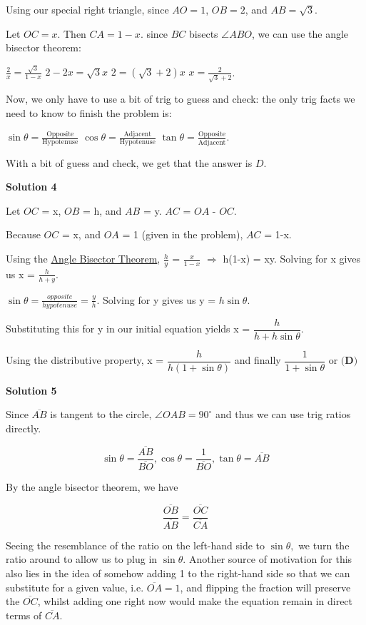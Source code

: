 \begin{enumerate}
 Using our special right triangle, since $AO=1$, $OB=2$, and $AB=\sqrt{3}$.

 Let $OC=x$.  Then $CA=1-x$.  since $BC$ bisects $\angle ABO$, we can use the angle bisector theorem:

 $\frac{2}{x}=\frac{\sqrt{3}}{1-x}$
$2-2x=\sqrt{3}x$
$2=(\sqrt{3}+2)x$
$x=\frac{2}{\sqrt{3}+2}$.

 Now, we only have to use a bit of trig to guess and check: the only trig facts we need to know to finish the problem is:

 $\sin\theta =\frac{\text{Opposite}}{\text{Hypotenuse}}$
$\cos\theta =\frac{\text{Adjacent}}{\text{Hypotenuse}}$
$\tan\theta =\frac{\text{Opposite}}{\text{Adjacent}}$.

 With a bit of guess and check, we get that the answer is $\boxed{D}$.

 



\textbf{Solution 4}

Let $OC$ = x, $OB$ = h, and $AB$ = y. $AC$ = $OA$ - $OC$.

 Because $OC$ = x, and $OA$ = 1 (given in the problem), $AC$ = 1-x.

 Using the \href{https://artofproblemsolving.com/wiki/index.php?title=Angle\_Bisector\_Theorem}{Angle Bisector Theorem}, $\frac{h}{y}$ = $\frac{x}{1-x}$ $\Longrightarrow$ h(1-x) = xy. Solving for x gives us x = $\frac{h}{h+y}$.

 $\sin\theta = \frac{opposite}{hypotenuse} = \frac{y}{h}$. Solving for y gives us y = $h \sin\theta$.

 Substituting this for y in our initial equation yields x = $\dfrac{h}{h+h\sin \theta}$.

 Using the distributive property, x = $\dfrac{h}{h(1+\sin \theta)}$ and finally $\dfrac{1}{1+\sin \theta}$ or $\boxed{\textbf{(D)}}$




\textbf{Solution 5}

Since $\overline{AB}$ is tangent to the circle, $\angle OAB=90^{\circ}$ and thus we can use trig ratios directly. 

 
 \[\sin{\theta}=\frac{\overline{AB}}{\overline{BO}}, \cos{\theta}=\frac{1}{\overline{BO}}, \tan{\theta}=\overline{AB}\]

 By the angle bisector theorem, we have 

 
 \[\frac{\overline{OB}}{\overline{AB}}=\frac{\overline{OC}}{\overline{CA}}\]

 Seeing the resemblance of the ratio on the left-hand side to $\sin{\theta},$ we turn the ratio around to allow us to plug in $\sin{\theta}.$ Another source of motivation for this also lies in the idea of somehow adding 1 to the right-hand side so that we can substitute for a given value, i.e. $\overline{OA}=1$, and flipping the fraction will preserve the $\overline{OC}$, whilst adding one right now would make the equation remain in direct terms of $\overline{CA}.$


\end{enumerate}
